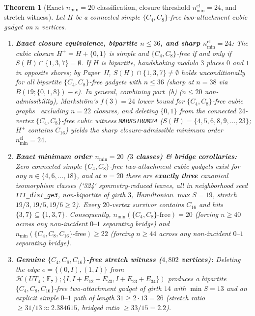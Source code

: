 \documentclass[11pt]{amsart}
\newtheorem{theorem}{Theorem}[section]
\theoremstyle{definition}
\theoremstyle{remark}
\newcommand{\F}{\mathbb{F}}
\newcommand{\Haar}{\mathcal{H}}
\begin{document}
\begin{theorem}[Exact $n_{\min} = 20$ classification, closure threshold $n_{\min}^{\mathrm{cl}} = 24$, and stretch witness]\label{thm:gadgets}
Let $H$ be a connected simple $\{C_4, C_8\}$-free two-attachment cubic gadget on $n$ vertices.
\begin{enumerate}[label=(\alph*)]
\item \textbf{Exact closure equivalence, bipartite $n \le 36$, and sharp $n_{\min}^{\mathrm{cl}} = 24$:} The cubic closure $H^+ = H + \{0,1\}$ is simple and $\{C_4, C_8\}$-free if and only if $S(H) \cap \{1, 3, 7\} = \emptyset$. If $H$ is bipartite, handshaking modulo $3$ places $0$ and $1$ in opposite shores; by Paper~II, $S(H) \cap \{1, 3, 7\} \ne \emptyset$ holds unconditionally for all bipartite $\{C_4, C_8\}$-free gadgets with $n \le 36$ (sharp at $n = 38$ via $B(19; \{0,1,8\}) - e$). In general, combining part~(b) ($n \le 20$ non-admissibility), Markstr\"om's $f(3) = 24$ lower bound for $\{C_4, C_8\}$-free cubic graphs~\cite{Markstrom2004,Garcia2026} excluding $n = 22$ closures, and deleting $\{0,1\}$ from the connected $24$-vertex $\{C_4, C_8\}$-free cubic witness \texttt{MARKSTROM24} ($S(H) = \{4, 5, 6, 8, 9, \dots, 23\}$; $H^+$ contains $C_{16}$) yields the sharp closure-admissible minimum order $n_{\min}^{\mathrm{cl}} = 24$.
\item \textbf{Exact minimum order $n_{\min} = 20$ ($3$ classes) \& bridge corollaries:} Zero connected simple $\{C_4, C_8\}$-free two-attachment cubic gadgets exist for any $n \in \{4, 6, \dots, 18\}$, and at $n = 20$ there are \textbf{exactly three} canonical isomorphism classes (`324` symmetry-reduced leaves, all in neighborhood seed \texttt{III\_dist\_ge3}, non-bipartite of girth $3$, Hamiltonian $\max S = 19$, stretch $19/3, 19/5, 19/6 \ge 2$). Every $20$-vertex survivor contains $C_{16}$ and hits $\{3,7\} \subseteq \{1,3,7\}$. Consequently, $n_{\min}(\{C_4, C_8\}\text{-free}) = 20$ (forcing $n \ge 40$ across any non-incident $0\text{--}1$ separating bridge) and \textbf{$n_{\min}(\{C_4, C_8, C_{16}\}\text{-free}) \ge 22$} (forcing $n \ge 44$ across any non-incident $0\text{--}1$ separating bridge).
\item \textbf{Genuine $\{C_4, C_8, C_{16}\}$-free stretch witness ($4{,}802$ vertices):} Deleting the edge $e = \{(0,I), (1,I)\}$ from $\Haar(UT_4(\F_7); \{I, I+E_{12}+E_{23}, I+E_{23}+E_{34}\})$ produces a bipartite $\{C_4, C_8, C_{16}\}$-free two-attachment gadget of girth $14$ with $\min S = 13$ and an explicit simple $0\text{--}1$ path of length $31 \ge 2 \cdot 13 = 26$ (stretch ratio $\ge 31/13 \approx 2.384615$, bridged ratio $\ge 33/15 = 2.2$).
\end{enumerate}
\end{theorem}
\end{document}
